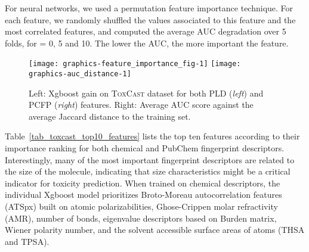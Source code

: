 \documentclass[11pt,a4paper]{article}
\begin{document}
For neural networks, we used a permutation feature importance technique. For each feature, we 
randomly shuffled the values associated to this feature and the  most correlated features, 
and computed the average AUC degradation over 5 folds, for  = 0, 5 and 10. The lower the AUC, 
the more important the feature.

\begin{figure}
  \centering 
  \texttt{[image: graphics-feature\_importance\_fig-1]} 
  \texttt{[image: graphics-auc\_distance-1]} 
  \caption{Left: Xgboost gain on \textsc{ToxCast} dataset for both PLD (\emph{left}) 
  and PCFP (\emph{right}) features. Right: Average AUC score against the average Jaccard distance to the
  training set.}  
  \label{fig_importance_cumulativegain}
\end{figure}  

Table~\ref{tab_toxcast_top10_features} lists the top ten features according to 
their importance ranking for both chemical and PubChem fingerprint descriptors. 
Interestingly, many of the most important fingerprint descriptors are
related to the size of the molecule, indicating that size characteristics might
be a critical indicator for toxicity prediction.
When trained on chemical descriptors, 
the individual Xgboost model prioritizes Broto-Moreau autocorrelation
features (ATSpx) built on atomic polarizabilities, Ghose-Crippen molar
refractivity (AMR), number of bonds, eigenvalue descriptors based on Burden
matrix, Wiener polarity number, and the solvent accessible surface areas of 
atoms (THSA and TPSA).    
\end{document}
